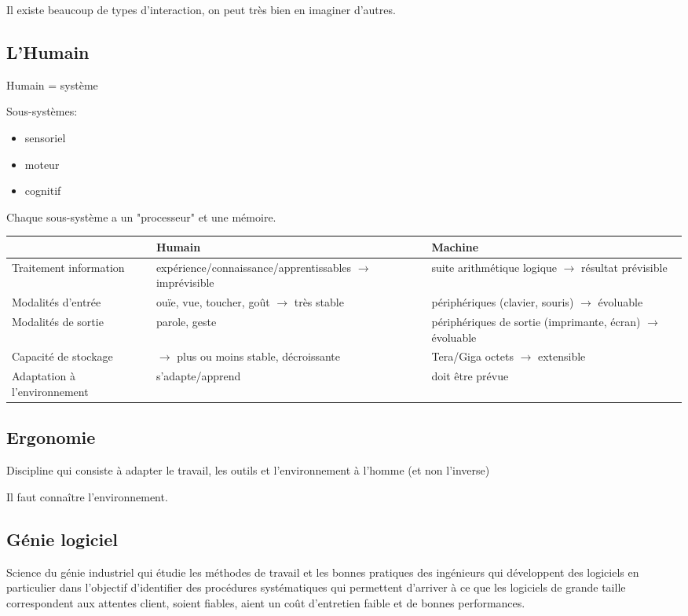 \documentclass{article}
\begin{document}
Il existe beaucoup de types d'interaction, on peut très bien en imaginer d'autres.

\subsection{L'Humain}
Humain = système

Sous-systèmes:
\begin{itemize}
	\item sensoriel
	\item moteur
	\item cognitif
\end{itemize}

Chaque sous-système a un "processeur" et une mémoire.

\begin{tabular}{|p{2cm}|p{8cm}|p{4cm}|}
\hline
& Humain & Machine\\
\hline
Traitement information & expérience/connaissance/apprentissables $\rightarrow$ imprévisible & suite arithmétique logique $\rightarrow$ résultat prévisible\\
\hline
Modalités d'entrée & ouïe, vue, toucher, goût $\rightarrow$ très stable & périphériques (clavier, souris) $\rightarrow$ évoluable\\
\hline
Modalités de sortie & parole, geste & périphériques de sortie (imprimante, écran) $\rightarrow$ évoluable\\
\hline
Capacité de stockage & $\rightarrow$ plus ou moins stable, décroissante & Tera/Giga octets $\rightarrow$ extensible\\
\hline
Adaptation à l'environnement & s'adapte/apprend & doit être prévue \\
\hline
\end{tabular}

\subsection{Ergonomie}
Discipline qui consiste à adapter le travail, les outils et l'environnement à l'homme (et non l'inverse)

Il faut connaître l'environnement.

\subsection{Génie logiciel}
Science du génie industriel qui étudie les méthodes de travail et les bonnes pratiques des ingénieurs qui développent des logiciels en particulier dans l'objectif d'identifier des procédures systématiques qui permettent d'arriver à ce que les logiciels de grande taille correspondent aux attentes client, soient fiables, aient un coût d'entretien faible et de bonnes performances.
\end{document}
